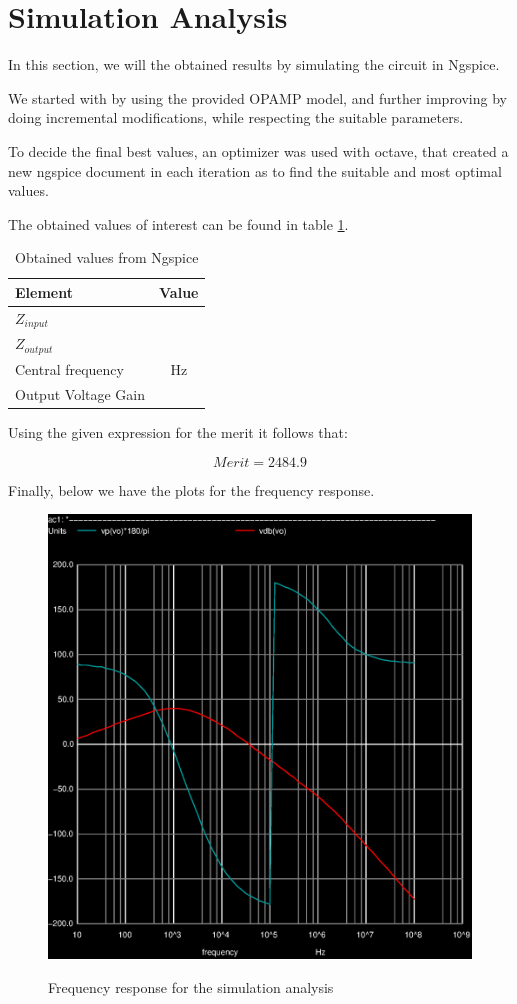\newpage

\section{Simulation Analysis}
\label{sec:simulation}

In this section, we will the obtained results by simulating the circuit in Ngspice.
 
We started with by using the provided OPAMP model, and further improving by doing incremental modifications, while respecting the suitable parameters.

To decide the final best values, an optimizer was used with octave, that created a new ngspice document in each iteration as to find the suitable and most optimal values. %

The obtained values of interest can be found in table \ref{tab:sim1}.

\begin{table}[h]
    \centering
    \begin{tabular}{|l|c|}
    \hline
    {\bf Element} & {\bf Value} \\
    \hline \hline
    $Z_{input}$ & \\
    \hline
    $Z_{output}$ & \\
    \hline
    Central frequency &  Hz \\
    \hline
    Output Voltage Gain & \\
    \hline
    \end{tabular}
    \caption{Obtained values from Ngspice}
    \label{tab:sim1}
\end{table}


Using the given expression for the merit it follows that:

\begin{equation}
    Merit = 2484.9
    \label{eq:merit}
\end{equation}

Finally, below we have the plots for the frequency response.

\begin{figure}[!ht] \centering
\caption{Frequency response for the simulation analysis}
\includegraphics[width=0.8\linewidth]{simulation.eps}
\label{fig:simulation}
\end{figure}


